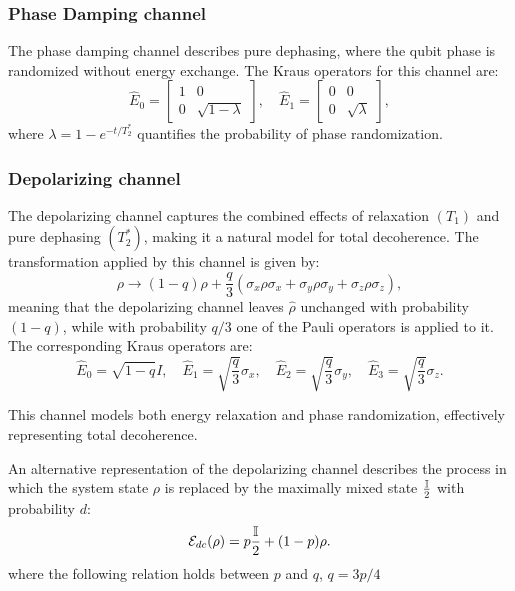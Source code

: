 \subsubsection{Phase Damping channel}
The phase damping channel describes pure dephasing, where the qubit phase is randomized without energy exchange. The Kraus operators for this channel are:
\begin{equation}
    \hat{E}_0 = \begin{bmatrix} 1 & 0 \\ 0 & \sqrt{1 - \lambda} \end{bmatrix}, \quad
    \hat{E}_1 = \begin{bmatrix} 0 & 0 \\ 0 & \sqrt{\lambda} \end{bmatrix},
\end{equation}
where $\lambda = 1 - e^{-t/T_2^*}$ quantifies the probability of phase randomization.

\subsubsection{Depolarizing channel}
The depolarizing channel captures the combined effects of relaxation $(T_1)$ and pure dephasing $(T_2^*)$, making it a natural model for total decoherence. The transformation applied by this channel is given by:
\begin{equation}
    \rho \rightarrow (1 - q) \rho + \frac{q}{3} (\sigma_x \rho \sigma_x + \sigma_y \rho \sigma_y + \sigma_z \rho \sigma_z),
\end{equation}
meaning that the depolarizing channel leaves  $\hat{\rho}$ unchanged with probability $(1-q)$, while with probability $q/3$ one of the Pauli operators is applied to it.
The corresponding Kraus operators are:
\begin{equation}
    \hat{E}_0 = \sqrt{1 - q} I, \quad
    \hat{E}_1 = \sqrt{\frac{q}{3}} \sigma_x, \quad
    \hat{E}_2 = \sqrt{\frac{q}{3}} \sigma_y, \quad
    \hat{E}_3 = \sqrt{\frac{q}{3}} \sigma_z.
\end{equation}

This channel models both energy relaxation and phase randomization, effectively representing total decoherence.

An alternative representation of the depolarizing channel describes the process in which the system state $\rho$ is replaced by the maximally mixed state $\frac{\mathbb{I}}{2}$ with probability $d$:
\begin{equation}\label{eq:depolarizing_channel}
    \mathcal{E}_{dc}(\rho) = p\frac{\mathbb{I}}{2}+(1-p)\rho.
\end{equation}
where the following relation holds between  $p$ and $q$, $q=3p/4$
